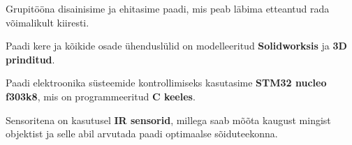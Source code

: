 \documentclass[letterpaper]{deedy-resume} %
\begin{document}
\begin{minipage}[t]{0.66\textwidth}
\sectionspace %


\begin{tightitemize}
\item Grupitööna disainisime ja ehitasime paadi, mis peab läbima etteantud rada võimalikult kiiresti.
\item Paadi kere ja kõikide osade ühenduslülid on modelleeritud \textbf{Solidworksis} ja \textbf{3D prinditud}.
\item Paadi elektroonika süsteemide kontrollimiseks kasutasime \textbf{STM32 nucleo f303k8}, mis on programmeeritud \textbf{C keeles}.
\item Sensoritena on kasutusel \textbf{IR sensorid}, millega saab mõõta kaugust mingist objektist ja selle abil arvutada paadi optimaalse sõiduteekonna.
\end{tightitemize}

\sectionspace %

\end{minipage} %

\end{document}
